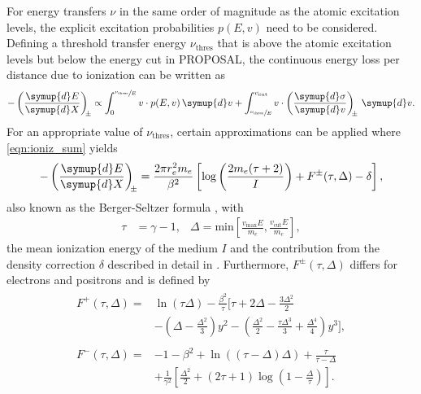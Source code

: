 For energy transfers $\nu$ in the same order of magnitude as the atomic excitation levels, the explicit excitation probabilities $p(E, v)$ need to be considered.
Defining a threshold transfer energy $\nu_{\text{thres}}$ that is above the atomic excitation levels but below the energy cut in PROPOSAL, the continuous energy loss per distance due to ionization can be written as
%
\begin{equation}
	\label{eqn:ioniz_sum}
	-\left(\frac{\symup{d}E}{\symup{d}X}\right)_{\!\!\pm} \propto \int_{0}^{\sfrac{\nu_{\text{thres}}}{E}} v \cdot p(E, v) \, \symup{d}v + \int_{\sfrac{\nu_{\text{thres}}}{E}}^{v_{\text{cut}}} v \cdot \left(\frac{\symup{d}\sigma}{\symup{d}v}\right)_{\!\!\pm} \, \symup{d}v. 
\end{equation}
%
For an appropriate value of $\nu_{\text{thres}}$, certain approximations can be applied where \eqref{eqn:ioniz_sum} yields
%
\begin{equation}
	- \left(\frac{\symup{d}E}{\symup{d}X}\right)_{\!\!\pm} = \frac{2 \pi r_e^2 m_e}{\beta^2} \left[ \log{\left( \frac{2 m_e (\tau + 2)}{I} \right) + F^{\pm}(\tau, \Delta) - \delta } \right],
\end{equation}
%
also known as the Berger-Seltzer formula \cite{Hirayama:2005zm}, with
%
\begin{align}
	\tau &= \gamma - 1, & \Delta = \text{min}\left[ \frac{v_{\text{max}} E}{m_e}, \frac{v_{\text{cut}} E}{m_e} \right],
\end{align}
%
the mean ionization energy of the medium $I$ and the contribution from the density correction $\delta$ described in detail in \cite{Kohne:2013zbq}.
Furthermore, $F^{\pm}(\tau, \Delta)$ differs for electrons and positrons and is defined by
\begin{align}
	\begin{split}
	F^{+}(\tau, \Delta) = &\ln\left(\tau \Delta \right) - \frac{\beta^2}{\tau} \biggl[ \tau + 2 \Delta - \frac{3 \Delta^2 }{2} \\ &- (\Delta - \frac{\Delta^2}{3}) y^2 - ( \frac{\Delta^2}{2} - \frac{\tau\Delta^3}{3} + \frac{\Delta^4}{4} ) y^3 \biggr],
	\end{split}
	\\[2ex]
	\begin{split}
	F^{-}(\tau, \Delta) = &-1 - \beta^2 + \ln\left( (\tau - \Delta) \Delta \right) + \frac{\tau}{\tau - \Delta} \\ &+ \frac{1}{\gamma^2} \left[ \frac{\Delta^2}{2} + (2 \tau + 1) \log\left( 1 - \frac{\Delta}{\tau} \right) \right].
	\end{split}
\end{align}

